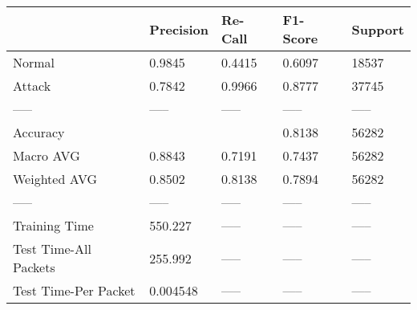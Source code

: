 \begin{tabular}{lllll}
\toprule
{} & Precision & Re-Call & F1-Score & Support \\
\midrule
Normal                &    0.9845 &  0.4415 &   0.6097 &   18537 \\
Attack                &    0.7842 &  0.9966 &   0.8777 &   37745 \\
-----                 &     ----- &   ----- &    ----- &   ----- \\
Accuracy              &           &         &   0.8138 &   56282 \\
Macro AVG             &    0.8843 &  0.7191 &   0.7437 &   56282 \\
Weighted AVG          &    0.8502 &  0.8138 &   0.7894 &   56282 \\
-----                 &     ----- &   ----- &    ----- &   ----- \\
Training Time         &   550.227 &   ----- &    ----- &   ----- \\
Test Time-All Packets &   255.992 &   ----- &    ----- &   ----- \\
Test Time-Per Packet  &  0.004548 &   ----- &    ----- &   ----- \\
\bottomrule
\end{tabular}
